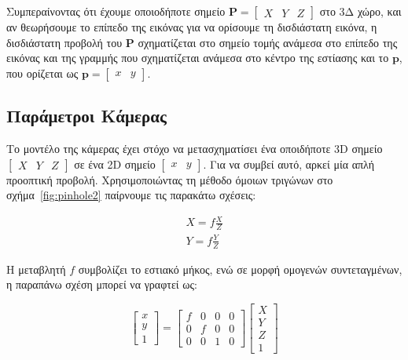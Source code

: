 Συμπεραίνοντας ότι έχουμε οποιοδήποτε σημείο $\mathbf{P} = \begin{bmatrix}X & Y &Z\end{bmatrix}$ στο 3Δ χώρο, και αν θεωρήσουμε το επίπεδο της εικόνας για να ορίσουμε τη δισδιάστατη εικόνα, η δισδιάστατη προβολή του $\mathbf{P}$ σχηματίζεται στο σημείο τομής ανάμεσα στο επίπεδο της εικόνας και της γραμμής που σχηματίζεται ανάμεσα στο κέντρο της εστίασης και το $\mathbf{p}$, που ορίζεται ως  $\mathbf{p} = \begin{bmatrix}x & y\end{bmatrix}$. 





\subsection{Παράμετροι Κάμερας}

Το μοντέλο της κάμερας έχει στόχο να μετασχηματίσει ένα οποιδήποτε 3D σημείο $\begin{bmatrix} X & Y & Z \end{bmatrix}$ σε ένα 2D σημείο $\begin{bmatrix} x & y\end{bmatrix}$. Για να συμβεί αυτό, αρκεί μία απλή προοπτική προβολή. Χρησιμοποιώντας τη μέθοδο όμοιων τριγώνων στο σχήμα~\ref{fig:pinhole2} παίρνουμε τις παρακάτω σχέσεις:


\begin{equation}
\begin{aligned}
X=f\frac{X}{Z}\\[0.2cm] 
Y=f\frac{Y}{Z}
\end{aligned}
\end{equation}


Η μεταβλητή $f$ συμβολίζει το εστιακό μήκος, ενώ σε μορφή ομογενών συντεταγμένων, η παραπάνω σχέση μπορεί να γραφτεί ως:

\begin{equation}
\begin{bmatrix}
x\\y\\1
\end{bmatrix}
=
\begin{bmatrix}
f & 0 & 0 & 0\\
0 & f & 0 & 0\\
0 & 0 & 1 & 0
\end{bmatrix}
\begin{bmatrix}
X\\
Y\\
Z\\
1
\end{bmatrix}
\end{equation}


